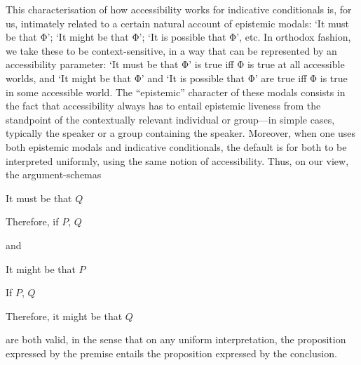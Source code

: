 \documentclass[If.tex]{subfiles}
\begin{document}
This characterisation of how accessibility works for indicative conditionals is, for us, intimately related to a certain natural account of epistemic modals: ‘It must be that Φ’; ‘It might be that Φ’; ‘It is possible that Φ’, etc. In orthodox fashion, we take these to be context-sensitive, in a way that can be represented by an accessibility parameter: ‘It must be that Φ’ is true iff Φ is true at all accessible worlds, and ‘It might be that Φ’ and ‘It is possible that Φ’ are true iff Φ is true in some accessible world. The “epistemic” character of these modals consists in the fact that accessibility always has to entail epistemic liveness from the standpoint of the contextually relevant individual or group---in simple cases, typically the speaker or a group containing the speaker.  Moreover, when one uses both epistemic modals and indicative conditionals, the default is for both to be interpreted uniformly, using the same notion of accessibility.  Thus, on our view, the argument-schemas
\begin{prop}
	\sitem[Must-if]
	It must be that $Q$
	
	Therefore, if $P$, $Q$
\end{prop}
and 
\begin{prop}
	It might be that $P$
	
	If $P$, $Q$
	
	Therefore, it might be that $Q$
\end{prop}
are both valid, in the sense that on any uniform interpretation, the proposition expressed by the premise entails the proposition expressed by the conclusion.  

\end{document}
